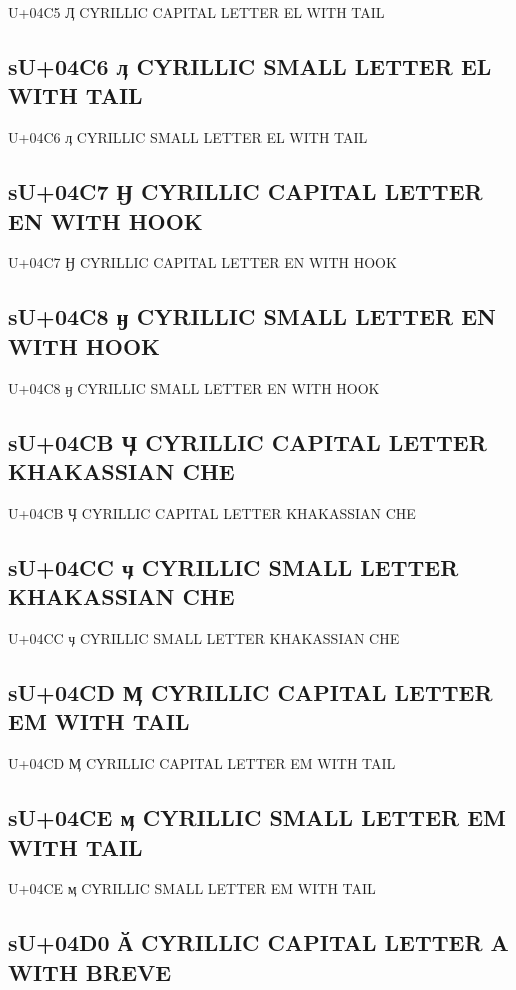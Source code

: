 U+04C5 Ӆ  CYRILLIC CAPITAL LETTER EL WITH TAIL

\subsection{sU+04C6 ӆ  CYRILLIC SMALL LETTER EL WITH TAIL}

U+04C6 ӆ  CYRILLIC SMALL LETTER EL WITH TAIL

\subsection{sU+04C7 Ӈ  CYRILLIC CAPITAL LETTER EN WITH HOOK}

U+04C7 Ӈ  CYRILLIC CAPITAL LETTER EN WITH HOOK

\subsection{sU+04C8 ӈ  CYRILLIC SMALL LETTER EN WITH HOOK}

U+04C8 ӈ  CYRILLIC SMALL LETTER EN WITH HOOK

\subsection{sU+04CB Ӌ  CYRILLIC CAPITAL LETTER KHAKASSIAN CHE}

U+04CB Ӌ  CYRILLIC CAPITAL LETTER KHAKASSIAN CHE

\subsection{sU+04CC ӌ  CYRILLIC SMALL LETTER KHAKASSIAN CHE}

U+04CC ӌ  CYRILLIC SMALL LETTER KHAKASSIAN CHE

\subsection{sU+04CD Ӎ  CYRILLIC CAPITAL LETTER EM WITH TAIL}

U+04CD Ӎ  CYRILLIC CAPITAL LETTER EM WITH TAIL

\subsection{sU+04CE ӎ  CYRILLIC SMALL LETTER EM WITH TAIL}

U+04CE ӎ  CYRILLIC SMALL LETTER EM WITH TAIL

\subsection{sU+04D0 Ӑ  CYRILLIC CAPITAL LETTER A WITH BREVE}

